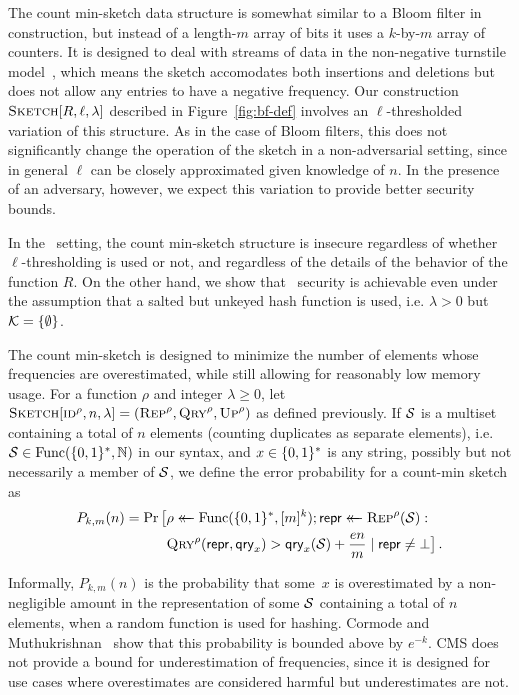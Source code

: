 The count min-sketch data structure is somewhat similar to a Bloom filter in
construction, but instead of a length-$m$ array of bits it uses a $k$-by-$m$
array of counters. It is designed to deal with streams of data in the
non-negative turnstile model~\cite{cormode2005improved}, which means the sketch
accomodates both insertions and deletions but does not allow any entries to have
a negative frequency. Our construction $\textnormal{\textsc{Sketch}}[R,\ell,\lambda]$ described in
Figure~\ref{fig:bf-def} involves an $\ell$-thresholded variation of this
structure. As in the case of Bloom filters, this does not significantly change
the operation of the sketch in a non-adversarial setting, since in general
$\ell$ can be closely approximated given knowledge of $n$. In the presence of an
adversary, however, we expect this variation to provide better security bounds.

In the \errep\ setting, the count min-sketch structure is insecure regardless of
whether $\ell$-thresholding is used or not, and regardless of the details of the
behavior of the function $R$. On the other hand, we show that \erreps\ security
is achievable even under the assumption that a salted but unkeyed hash function
is used, i.e. $\lambda > 0$ but $\mathcal{K} = \{\emptyset\}$.

%
The count min-sketch is designed to minimize the number of elements whose
frequencies are overestimated, while still allowing for reasonably low memory
usage. For a function $\rho$ and integer $\lambda\ge0$, let
$\textnormal{\textsc{Sketch}}[\textnormal{\textsc{id}}^\rho,n,\lambda] = (\textnormal{\textsc{Rep}}^\rho,\textnormal{\textsc{Qry}}^\rho,\textnormal{\textsc{Up}}^\rho)$ as defined
previously. If $\mathcal{S}$ is a multiset containing a total of $n$ elements
(counting duplicates as separate elements), i.e. $\mathcal{S} \in \mathrm{Func}(\{0,1\}^*,\mathbb{N})$ in
our syntax, and $x \in \{0,1\}^*$ is any string, possibly but not necessarily a
member of $\mathcal{S}$, we define the error probability for a count-min sketch as
\begin{equation}\label{eq:bf-fp}
  \begin{aligned}
    P_{k,m}(n) =
      \Pr\big[&\rho \mathrel{\leftarrow\mkern-14mu\leftarrow} \mathrm{Func}(\{0,1\}^*,[m]^k);
              \mathsf{repr} \mathrel{\leftarrow\mkern-14mu\leftarrow} \textnormal{\textsc{Rep}}^\rho(\mathcal{S}): \\
              &\textnormal{\textsc{Qry}}^\rho(\mathsf{repr}, \mathsf{qry}_x) > \mathsf{qry}_x(\mathcal{S})+\frac{en}{m} \mid \mathsf{repr} \ne \bot
      \big] \,.
  \end{aligned}
\end{equation}

Informally, $P_{k,m}(n)$ is the probability that some~$x$ is overestimated by a
non-negligible amount in the representation of some $\mathcal{S}$ containing a total
of $n$ elements, when a random function is used for hashing. Cormode and
Muthukrishnan~\cite{cormode2005improved} show that this probability is bounded
above by $e^{-k}$. CMS does not provide a bound for underestimation of
frequencies, since it is designed for use cases where overestimates are
considered harmful but underestimates are not.

